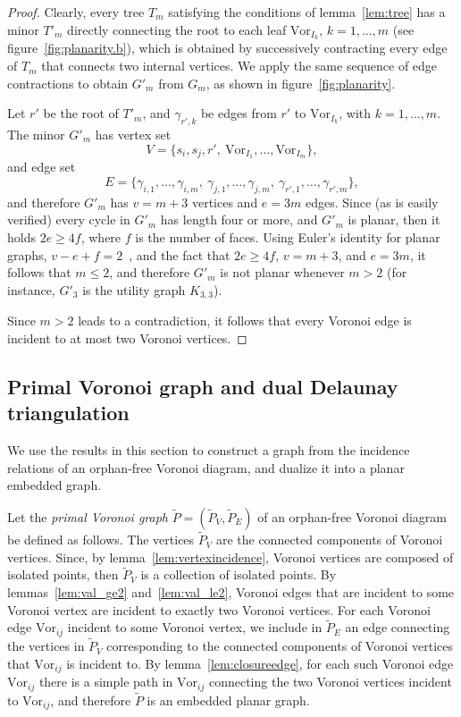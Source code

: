 \documentclass[11pt]{article}
\newcommand{\Vor}{\text{Vor}}
\begin{document}
\begin{proof}
Clearly, every tree $T_m$ satisfying the conditions of lemma~\ref{lem:tree} has a minor $T'_m$ 
	directly connecting the root to each leaf $\Vor_{I_k}$, $k=1,\dots,m$ (see figure~\ref{fig:planarity.b}), 
	which is obtained by successively contracting every edge of $T_m$ that connects two internal vertices. 
We apply the same sequence of edge contractions to obtain $G'_m$ from $G_m$, as shown in figure~\ref{fig:planarity}. 



Let $r'$ be the root of $T'_m$, and $\gamma_{r',k}$ be edges from $r'$ to $\Vor_{I_k}$, with $k=1,\dots,m$. 
The minor $G'_m$ has vertex set
	\[ V=\{s_i,s_j,r', ~\Vor_{I_1},\dots,\Vor_{I_m}\},\]
and edge set
	\[ E=\{ \gamma_{i,1},\dots,\gamma_{i,m}, ~ \gamma_{j,1},\dots,\gamma_{j,m}, ~ \gamma_{r',1},\dots,\gamma_{r',m}\},\]
and therefore $G'_m$ has $v=m+3$ vertices and $e=3m$ edges.  
Since (as is easily verified) every cycle in $G'_m$ has length four or more, and $G'_m$ is planar, 
	then it holds $2e \ge 4f$, where $f$ is the number of faces. 
Using Euler's identity for planar graphs, $v-e+f=2$~\cite{bondy2008graph}, 
	and the fact that $2e \ge 4f$, $v=m+3$, and $e=3m$, it follows that $m \le 2$, 
	and therefore $G'_m$ is not planar whenever $m> 2$
(for instance, $G'_3$ is the utility graph $K_{3,3}$). 




Since $m> 2$ leads to a contradiction, it follows that every Voronoi edge is incident to at most two Voronoi vertices.
\end{proof}

\subsection{Primal Voronoi graph and dual Delaunay triangulation}\label{primaldual}

We use the results in this section to construct a graph from the 
	incidence relations of an orphan-free Voronoi diagram, 
	and dualize it into a planar embedded graph. 

Let the \emph{primal Voronoi graph} $\tilde{P}=(\tilde{P}_V, \tilde{P}_E)$
	of an orphan-free Voronoi diagram be defined as follows. 
The vertices $\tilde{P}_V$ are the connected components of Voronoi vertices. 
Since, by lemma~\ref{lem:vertexincidence}, 
	Voronoi vertices are composed of isolated points, then $\tilde{P}_V$ is a collection of isolated points. 
By lemmas~\ref{lem:val_ge2} and~\ref{lem:val_le2}, 
	Voronoi edges that are incident to some Voronoi vertex are incident to exactly two Voronoi vertices. 
For each Voronoi edge $\Vor_{ij}$ incident to some Voronoi vertex, 
	we include in $\tilde{P}_E$ an edge connecting the vertices in $\tilde{P}_V$ 
	corresponding to the connected components of Voronoi vertices that $\Vor_{ij}$ is incident to. 
By lemma~\ref{lem:closureedge}, for each such Voronoi edge $\Vor_{ij}$ there is a simple path in $\Vor_{ij}$
	connecting the two Voronoi vertices incident to $\Vor_{ij}$, and therefore $\tilde{P}$ is an embedded planar graph. 
\end{document}
